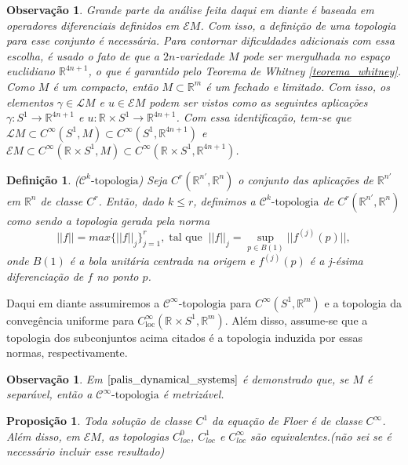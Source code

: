 \documentclass[12pt]{book}
\newtheorem{definicao}[teorema]{Definição}
\newtheorem{observacao}[teorema]{Observação}
\newtheorem{proposicao}[teorema]{Proposição}
\newcommand{\aplicaoessuaves}[2]{C^{\infty}(#1, #2)}
\newcommand{\aplicaoessuavesloc}[2]{C^{\infty}_{\text{loc}}(#1, #2)}
\newcommand{\circulo}{S^{1}}
\newcommand{\cktopologia}[1]{\mathcal{C}^{#1}\text{-topologia}}
\newcommand{\energiafinitaM}{\mathcal{E}M}
\newcommand{\norma}[1]{||#1||}
\newcommand{\retacartesianocirculo}{\real{} \times \circulo}
\newcommand{\real}[1]{\mathbb{R}^{#1}}
\newcommand{\lacocontrateis}{\mathcal{L}M}
\newcommand{\vermelho}[1]{{\color{red}#1}}
\begin{document}
 	\begin{observacao}\label{observacao_mergulho_variedade}
 		Grande parte da análise feita daqui em diante é baseada em operadores diferenciais definidos em $\energiafinitaM$. Com isso, a definição de uma topologia para esse conjunto é necessária. Para contornar dificuldades adicionais com essa escolha, é usado o fato de que a $2n$-variedade $M$ pode ser mergulhada no espaço euclidiano $\real{4n+1}$, o que é garantido pelo Teorema de Whitney \ref{teorema_whitney}. Como $M$ é um compacto, então $M \subset\real{m}$ é um fechado e limitado. Com isso, os elementos $\gamma\in \lacocontrateis$ e $u\in \energiafinitaM$ podem ser vistos como as seguintes aplicações $\gamma:\circulo \to \real{4n+1}$ e $u:\retacartesianocirculo \to \real{4n+1}$. Com essa identificação, tem-se que $\lacocontrateis\subset \aplicaoessuaves{\circulo}{M}\subset \aplicaoessuaves{\circulo}{\real{4n+1}}$ e $\energiafinitaM \subset \aplicaoessuaves{\retacartesianocirculo}{M}\subset \aplicaoessuaves{\retacartesianocirculo}{\real{4n+1}}$. 
 	\end{observacao}
 	
	\begin{definicao}
		($\cktopologia{k}$) Seja $C^{r}(\real{n'}, \real{n})$ o conjunto das aplicações de $\real{n'}$ em $\real{n}$ de classe $C^{r}$. Então, dado $k\leq r$, definimos a $\cktopologia{k}$ de $C^{r}(\real{n'}, \real{n})$ como sendo a topologia gerada pela norma
		$$
		\norma{f} = max \{\norma{f}_{j}\}_{j=1}^{r},\; \text{tal que} \;\; \norma{f}_{j} = \sup_{p \in B(1)}\norma{f^{(j)}(p)},
		$$
		onde $B(1)$ é a bola unitária centrada na origem e $f^{(j)}(p)$ é a j-ésima diferenciação de $f$ no ponto $p$.
	\end{definicao}
	
	Daqui em diante assumiremos a $\cktopologia{\infty}$ para $\aplicaoessuaves{\circulo}{\real{m}}$ e a topologia da convegência uniforme para $\aplicaoessuavesloc{\retacartesianocirculo}{\real{m}}$. Além disso, assume-se que a topologia dos subconjuntos acima citados é a topologia induzida por essas normas, respectivamente.

	\begin{observacao}
		Em $\cite{palis_dynamical_systems}$ é demonstrado que, se $M$ é separável, então a $\cktopologia{\infty}$ é metrizável.
	\end{observacao}

	\vermelho{
	\begin{proposicao}
	Toda solução de classe $C^{1}$ da equação de Floer é de classe $C^{\infty}$. Além disso, em $\energiafinitaM$, as topologias $C^{0}_{loc}$, $C^{1}_{loc}$ e $C^{\infty}_{loc}$ são equivalentes.(não sei se é necessário incluir esse resultado)
	\end{proposicao}
	}
	
\end{document}
